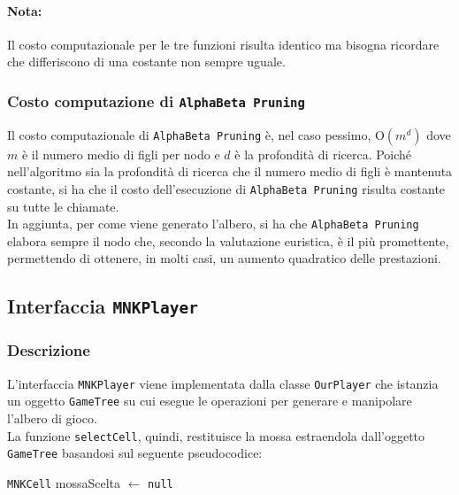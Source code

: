 \documentclass[11pt]{article}
\begin{document}
\paragraph*{Nota: }Il costo computazionale per le tre funzioni risulta identico ma bisogna ricordare che differiscono di una costante non sempre uguale.
\newpage
\subsubsection*{Costo computazione di \texttt{AlphaBeta Pruning}}
Il costo computazionale di \texttt{AlphaBeta Pruning} è, nel caso pessimo, O$(m^d)$ dove $m$ è il numero medio di figli per nodo e $d$ è la profondità di ricerca. Poiché nell'algoritmo sia la profondità di ricerca che il numero medio di figli è mantenuta costante, si ha che il costo dell'esecuzione di \texttt{AlphaBeta Pruning} risulta costante su tutte le chiamate.\\
In aggiunta, per come viene generato l'albero, si ha che \texttt{AlphaBeta Pruning} elabora sempre il nodo che, secondo la valutazione euristica, è il più promettente, permettendo di ottenere, in molti casi, un aumento quadratico delle prestazioni.

\subsection*{Interfaccia \texttt{MNKPlayer}}
\subsubsection*{Descrizione}
L'interfaccia \texttt{MNKPlayer} viene implementata dalla classe \texttt{OurPlayer} che istanzia un oggetto \texttt{GameTree} su cui esegue le operazioni per generare e manipolare l'albero di gioco.\\
La funzione \texttt{selectCell}, quindi, restituisce la mossa estraendola dall'oggetto \texttt{GameTree} basandosi sul seguente pseudocodice:
\begin{algorithm*}
\SetAlgoLined
\texttt{MNKCell} mossaScelta $\gets$ \texttt{null}\\
\vspace{0.2cm}
\end{algorithm*}
\vspace{-0.7cm}
\end{document}
